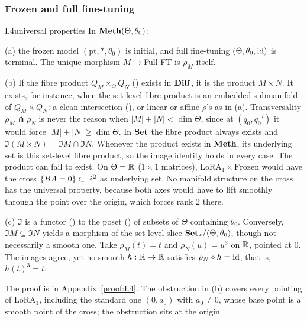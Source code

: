 \subsubsection{Frozen and full fine-tuning}\label{sec:slice-interval}

\begin{observation}{I.4}{universal properties}
In $\mathbf{Meth}(\Theta,\theta_0)$:

(a) the frozen model $(\mathrm{pt},*,\theta_0)$ is initial, and full fine-tuning $(\Theta,\theta_0,\mathrm{id})$ is terminal. The
unique morphism $M\to{}$Full FT is $\rho_M$ itself.

(b) If the fibre product $Q_M\times_\Theta Q_N$ () exists in $\mathbf{Diff}$, it is the product $M\times N$. It exists,
for instance, when the set-level fibre product is an embedded submanifold of $Q_M\times Q_N$: a clean intersection
(), or linear or affine $\rho$'s as in (a). Transversality $\rho_M\pitchfork\rho_N$ is
never the reason when $\lvert M\rvert+\lvert N\rvert<\dim\Theta$, since at $(q_0,q_0')$ it would force
$\lvert M\rvert+\lvert N\rvert\ge\dim\Theta$. In $\mathbf{Set}$ the fibre product always exists and
$\Im(M\times N)=\Im M\cap\Im N$. Whenever the product exists in $\mathbf{Meth}$, its underlying set is this set-level fibre
product, so the image identity holds in every case. The product can fail to exist. On $\Theta=\mathbb{R}$ ($1\times1$ matrices),
$\mathrm{LoRA}_1\times\text{Frozen}$ would have the cross $\{BA=0\}\subset\mathbb{R}^2$ as underlying set. No manifold structure
on the cross has the universal property, because both axes would have to lift smoothly through the point over the origin,
which forces rank $2$ there.

(c) $\Im$ is a functor () to the poset () of subsets of $\Theta$ containing $\theta_0$. Conversely,
$\Im M\subseteq\Im N$ yields a morphism of the set-level slice $\mathbf{Set}_*/(\Theta,\theta_0)$, though not necessarily a smooth
one. Take $\rho_M(t)=t$ and $\rho_N(u)=u^3$ on $\mathbb{R}$, pointed at $0$. The images agree, yet no smooth $h:\mathbb{R}\to\mathbb{R}$ satisfies
$\rho_N\circ h=\mathrm{id}$, that is, $h(t)^3=t$.
\end{observation}

\noindent The proof is in Appendix~\ref{proof:I.4}. The obstruction in (b) covers every pointing of $\mathrm{LoRA}_1$,
including the standard one $(0,a_0)$ with $a_0\neq0$, whose base point is a smooth point of the cross; the obstruction sits
at the origin.

